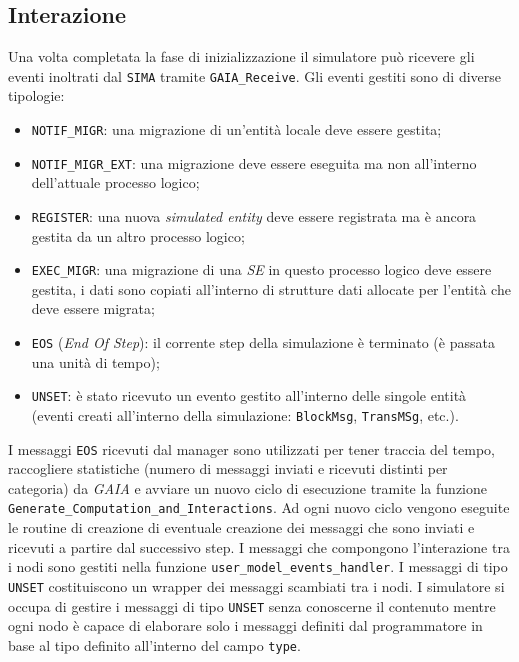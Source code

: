 \begin{code}
\section{Interazione}
Una volta completata la fase di inizializzazione il simulatore può ricevere gli eventi inoltrati dal \texttt{SIMA} tramite \texttt{GAIA\_Receive}. Gli eventi gestiti sono di diverse tipologie:
\begin{itemize}
    \item \texttt{NOTIF\_MIGR}: una migrazione di un'entità locale deve essere gestita;
    \item \texttt{NOTIF\_MIGR\_EXT}: una migrazione deve essere eseguita ma non all'interno dell'attuale processo logico;
    \item \texttt{REGISTER}: una nuova \textit{simulated entity} deve essere registrata ma è ancora gestita da un altro processo logico;
    \item \texttt{EXEC\_MIGR}: una migrazione di una \textit{SE} in questo processo logico deve essere gestita, i dati sono copiati all'interno di strutture dati allocate per l'entità che deve essere migrata;
    \item \texttt{EOS} (\textit{End Of Step}): il corrente step della simulazione è terminato (è passata una unità di tempo);
    \item \texttt{UNSET}: è stato ricevuto un evento gestito all'interno delle singole entità (eventi creati all'interno della simulazione: \texttt{BlockMsg}, \texttt{TransMSg}, etc.).
\end{itemize}
I messaggi \texttt{EOS} ricevuti dal manager sono utilizzati per tener traccia del tempo, raccogliere statistiche (numero di messaggi inviati e ricevuti distinti per categoria) da \textit{GAIA} e avviare un nuovo ciclo di esecuzione tramite la funzione \texttt{Generate\_Computation\_and\_Interactions}. Ad ogni nuovo ciclo vengono eseguite le routine di creazione di eventuale creazione dei messaggi che sono inviati e ricevuti a partire dal successivo step.\newline
I messaggi che compongono l'interazione tra i nodi sono gestiti nella funzione \texttt{user\_model\_events\_handler}. I messaggi di tipo \texttt{UNSET} costituiscono un wrapper dei messaggi scambiati tra i nodi. I simulatore si occupa di gestire i messaggi di tipo \texttt{UNSET} senza conoscerne il contenuto mentre ogni nodo è capace di elaborare solo i messaggi definiti dal programmatore in base al tipo definito all'interno del campo \texttt{type}.\newline

\end{code}
